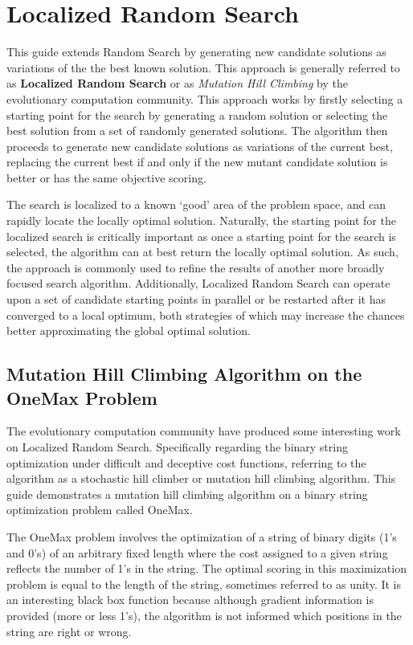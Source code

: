 \section{Localized Random Search}
This guide extends Random Search by generating new candidate solutions as variations of the the best known solution. This approach is generally referred to as \textbf{Localized Random Search} or as \emph{Mutation Hill Climbing} by the evolutionary computation community. This approach works by firstly selecting a starting point for the search by generating a random solution or selecting the best solution from a set of randomly generated solutions. The algorithm then proceeds to generate new candidate solutions as variations of the current best, replacing the current best if and only if the new mutant candidate solution is better or has the same objective scoring.

The search is localized to a known `good' area of the problem space, and can rapidly locate the locally optimal solution. Naturally, the starting point for the localized search is critically important as once a starting point for the search is selected, the algorithm can at best return the locally optimal solution. As such, the approach is commonly used to refine the results of another more broadly focused search algorithm. Additionally, Localized Random Search can operate upon a set of candidate starting points in parallel or be restarted after it has converged to a local optimum, both strategies of which may increase the chances better approximating the global optimal solution.

\subsection{Mutation Hill Climbing Algorithm on the OneMax Problem}
The evolutionary computation community have produced some interesting work on Localized Random Search. Specifically regarding the binary string optimization under difficult and deceptive cost functions, referring to the algorithm as a stochastic hill climber or mutation hill climbing algorithm. This guide demonstrates a mutation hill climbing algorithm on a binary string optimization problem called OneMax.

The OneMax problem involves the optimization of a string of binary digits (1's and 0's) of an arbitrary fixed length where the cost assigned to a given string reflects the number of 1's in the string. The optimal scoring in this maximization problem is equal to the length of the string, sometimes referred to as unity. It is an interesting black box function because although gradient information is provided (more or less 1's), the algorithm is not informed which positions in the string are right or wrong.

